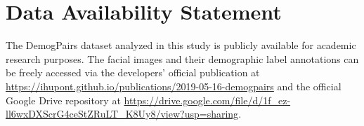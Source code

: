 \section*{Data Availability Statement}

The DemogPairs dataset analyzed in this study is publicly available for academic research purposes. The facial images and their demographic label annotations can be freely accessed via the developers' official publication at \url{https://ihupont.github.io/publications/2019-05-16-demogpairs} and the official Google Drive repository at \url{https://drive.google.com/file/d/1f_ez-ll6wxDXScrG4ceStZRuLT_K8Uy8/view?usp=sharing}.
